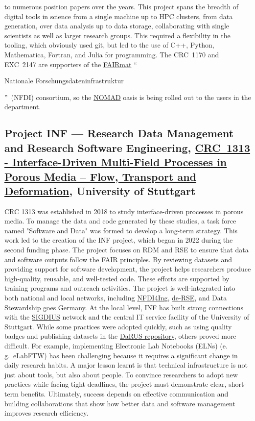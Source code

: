 \documentclass{eceasst}
\newenvironment{de}{\begin{otherlanguage}{ngerman}}{\end{otherlanguage}}
\newcommand{\eg}{e.\,g.}
\newcommand{\elabftw}{\href{https://www.elabftw.net/}{eLabFTW}}
\begin{document}
to numerous position papers\cite{Anzt:2020,Goth:2025,gi2025,Kempf2026} over the years.
This project spans the breadth of digital tools in science from a single machine up to HPC clusters, from data generation, over data analysis up to data storage, collaborating with single scientists as well as larger research groups.
This required a flexibility in the tooling, which obviously used git, but led to the use of C++, Python, Mathematica, Fortran, and Julia for programming.
The CRC~1170 and EXC~2147 are supporters of the \href{https://www.fairmat-nfdi.eu/fairmat/}{FAIRmat} “\begin{de}Nationale Forschungsdateninfrastruktur\end{de}” (NFDI) consortium, so the \href{https://nomad-lab.eu/nomad-lab/nomad.html}{NOMAD} oasis is being rolled out to
the users in the department.

\subsection{Project INF --- Research Data Management and Research Software Engineering, \href{https://gepris.dfg.de/gepris/projekt/327154368}{CRC~1313 - Interface-Driven Multi-Field Processes in Porous Media – Flow, Transport and Deformation}, University of Stuttgart}
\label{subsec:crc1313}
CRC 1313 was established in 2018 to study interface-driven processes in porous media.
To manage the data and code generated by these studies, a task force named "Software and Data" was formed to develop a long-term strategy.
This work led to the creation of the INF project, which began in 2022 during the second funding phase.
The project focuses on RDM and RSE to ensure that data and software outputs follow the FAIR principles.
By reviewing datasets and providing support for software development, the project helps researchers produce high-quality, reusable, and well-tested code.
These efforts are supported by training programs and outreach activities.
The project is well-integrated into both national and local networks, including \href{https://nfdi4ing.de/}{NFDI4Ing}, \href{https://de-rse.org}{de-RSE}, and Data Stewardship goes Germany.
At the local level, INF has built strong connections with the \href{https://www.simtech.uni-stuttgart.de/communication/events/workshops/sigdius-seminars/}{SIGDIUS} network and the central IT service facility of the University of Stuttgart. While some practices were adopted quickly, such as using quality badges and publishing datasets in the \href{https://darus.uni-stuttgart.de/}{DaRUS repository}, others proved more difficult.
For example, implementing Electronic Lab Notebooks (ELNs) (\eg~\elabftw) has been challenging because it requires a significant change in daily research habits.
A major lesson learnt is that technical infrastructure is not just about tools, but also about people. To convince researchers to adopt new practices while facing tight deadlines, the project must demonstrate clear, short-term benefits.
Ultimately, success depends on effective communication and building collaborations that show how better data and software management improves research efficiency.
\end{document}
